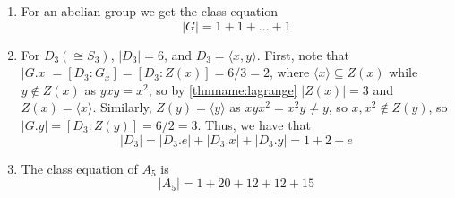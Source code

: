 \documentclass[12pt, a4paper, oneside, openright, titlepage]{book}
\begin{document}
\begin{eg}
        \leavevmode
        \begin{enumerate}
                \item For an abelian group we get the class equation \begin{equation}
                                |G| = 1+1+...+1
                \end{equation}
                \item For $D_3 (\cong S_3)$, $|D_3| = 6$, and $D_3 = \langle x,y\rangle$. First, note that $|G.x| = [D_3:G_x] = [D_3:Z(x)] = 6/3 = 2$, where $\langle x \rangle \subseteq Z(x)$ while $y \notin Z(x)$ as $yxy = x^2$, so by \ref{thmname:lagrange} $|Z(x)| = 3$ and $Z(x) = \langle x \rangle$. Similarly, $Z(y) = \langle y \rangle$ as $xyx^2 = x^2y \neq y$, so $x,x^2 \notin Z(y)$, so $|G.y| = [D_3:Z(y)] = 6/2 = 3$. Thus, we have that \begin{equation}
                                |D_3| = |D_3.e| + |D_3.x| + |D_3.y| = 1 + 2 + e
                \end{equation}
        \item The class equation of $A_5$ is \begin{equation}
                        |A_5| = 1+ 20 + 12 + 12 + 15
        \end{equation}

\end{enumerate}
\end{eg}
\end{document}
